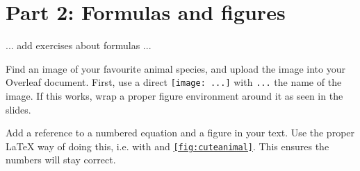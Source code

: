 \documentclass[a4paper]{article}
\begin{document}
\section{Part 2: Formulas and figures}

\begin{exercise}
    ... add exercises about formulas ...
\end{exercise}

\begin{exercise}
    Find an image of your favourite animal species, and upload the image into your
    Overleaf document. First, use a direct \texttt{\texttt{[image: ...]}}
    with \texttt{...} the name of the image. If this works, wrap
    a proper figure environment around it as seen in the slides.
\end{exercise}

\begin{exercise}[reference]
    Add a reference to a numbered equation and a figure in your text. Use the proper
    \LaTeX{} way of doing this, i.e. with \texttt{\label{fig:cuteanimal}}
    and \texttt{\ref{fig:cuteanimal}}. This ensures the numbers will stay
    correct.
\end{exercise}



\end{document}
